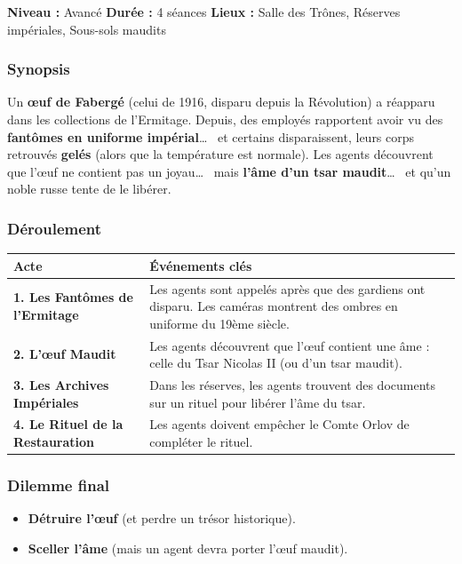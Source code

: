 \documentclass[10pt,a5paper,twoside]{book}
\begin{document}
\begin{shaded}
	\textbf{Niveau :} Avancé \quad
	\textbf{Durée :} 4 séances \quad
	\textbf{Lieux :} Salle des Trônes, Réserves impériales, Sous-sols maudits
\end{shaded}

\subsubsection*{Synopsis}
Un \textbf{\oe uf de Fabergé} (celui de 1916, disparu depuis la Révolution) a réapparu dans les collections de l'Ermitage. Depuis, des employés rapportent avoir vu des \textbf{fantômes en uniforme impérial}\ldots~  et certains disparaissent, leurs corps retrouvés \textbf{gelés} (alors que la température est normale). Les agents découvrent que l'\oe uf ne contient pas un joyau\ldots~  mais \textbf{l'âme d'un tsar maudit}\ldots~  et qu'un noble russe tente de le libérer.

\subsubsection*{Déroulement}
\begin{center}
	\begin{tabular}{|P{3cm}|P{9cm}|}
	\hline
	\textbf{Acte} 								& \textbf{Événements clés} \\ \hline
	\textbf{1. Les Fantômes de l'Ermitage} 		& Les agents sont appelés après que des gardiens ont disparu. Les caméras montrent des ombres en uniforme du 19ème siècle. \\ \hline
	\textbf{2. L'\oe uf Maudit} 				& Les agents découvrent que l'\oe uf contient une âme : celle du Tsar Nicolas II (ou d'un tsar maudit). \\ \hline
	\textbf{3. Les Archives Impériales} 		& Dans les réserves, les agents trouvent des documents sur un rituel pour libérer l'âme du tsar. \\ \hline
	\textbf{4. Le Rituel de la Restauration} 	& Les agents doivent empêcher le Comte Orlov de compléter le rituel. \\ \hline
	\end{tabular}
\end{center}

\subsubsection*{Dilemme final}
\begin{itemize}
	\item \textbf{Détruire l'\oe uf} (et perdre un trésor historique).
	\item \textbf{Sceller l'âme} (mais un agent devra porter l'\oe uf maudit).
\end{itemize}
\end{document}

